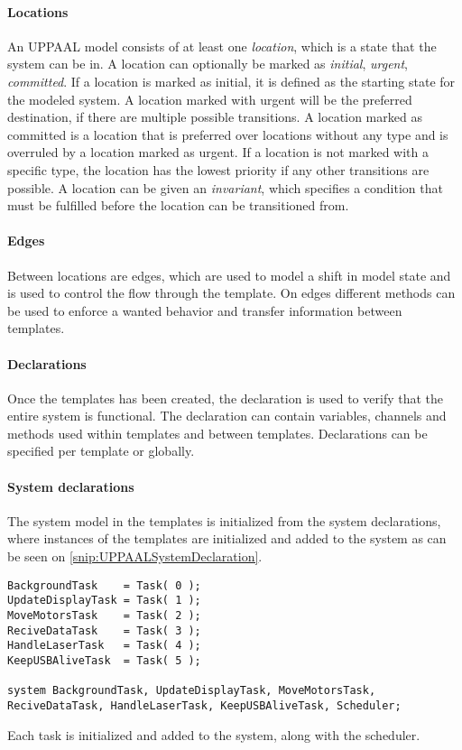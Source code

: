 \paragraph{Locations}
An UPPAAL model consists of at least one \textit{location}, which is a state that the system can be in.
A location can optionally be marked as \textit{initial}, \textit{urgent}, \textit{committed}.
If a location is marked as initial, it is defined as the starting state for the modeled system.
A location marked with urgent will be the preferred destination, if there are multiple possible transitions.
A location marked as committed is a location that is preferred over locations without any type and is overruled by a location marked as urgent.
If a location is not marked with a specific type, the location has the lowest priority if any other transitions are possible.
A location can be given an \textit{invariant}, which specifies a condition that must be fulfilled before the location can be transitioned from.

\paragraph{Edges}
Between locations are edges, which are used to model a shift in model state and is used to control the flow through the template.
On edges different methods can be used to enforce a wanted behavior and transfer information between templates.

\paragraph{Declarations}
Once the templates has been created, the declaration is used to verify that the entire system is functional.
The declaration can contain variables, channels and methods used within templates and between templates.
Declarations can be specified per template or globally.

\paragraph{System declarations}
The system model in the templates is initialized from the system declarations, where instances of the templates are initialized and added to the system as can be seen on \autoref{snip:UPPAALSystemDeclaration}.


\begin{lstlisting}[label={snip:UPPAALSystemDeclaration},caption={System declaration from UPPAAL},frame=tlrb,numbers=none]
BackgroundTask    = Task( 0 );
UpdateDisplayTask = Task( 1 );
MoveMotorsTask    = Task( 2 );
ReciveDataTask    = Task( 3 );
HandleLaserTask   = Task( 4 );
KeepUSBAliveTask  = Task( 5 );

system BackgroundTask, UpdateDisplayTask, MoveMotorsTask, ReciveDataTask, HandleLaserTask, KeepUSBAliveTask, Scheduler;
\end{lstlisting}
Each task is initialized and added to the system, along with the scheduler.

